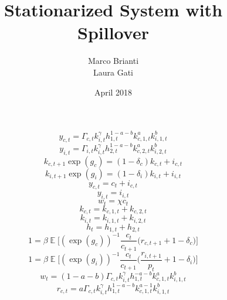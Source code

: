 \documentclass{article}
\title{Stationarized System with Spillover}
\author{Marco Brianti\\Laura Gati}
\date{April 2018}
\DeclareMathOperator{\E}{\mathbb{E}}
\begin{document}
	
	\maketitle

\Large{
	

\begin{equation}
y_{c,t} = \Gamma_{c,t} k_{i,t}^{\gamma} h_{1,t}^{1 - a- b} k_{c,1,t}^a k_{i,1,t}^b
\end{equation}
\begin{equation}
y_{i,t} = \Gamma_{i,t} k_{i,t}^{\gamma} h_{2,t}^{1 - a- b} k_{c,2,t}^a k_{i,2,t}^b
\end{equation}
\begin{equation}
k_{c,t+1} \exp{(g_c)} = (1 - \delta_c)k_{c,t} + i_{c,t}
\end{equation}
\begin{equation}
k_{i,t+1} \exp{(g_i)} = (1 - \delta_i)k_{i,t} + i_{i,t}
\end{equation}
\begin{equation}
y_{c,t} = c_{t} + i_{c,t}
\end{equation}
\begin{equation}
y_{i,t} = i_{i,t}
\end{equation}
\begin{equation}
w_{t} = \chi c_{t}
\end{equation}
\begin{equation}
k_{c,t} = k_{c,1,t} + k_{c,2,t}
\end{equation}
\begin{equation}
k_{i,t} = k_{i,1,t} + k_{i,2,t}
\end{equation}
\begin{equation}
h_{t} = h_{1,t} + h_{2,t}
\end{equation}
\begin{equation}
1 = \beta \E \bigg[ (\exp{(g_c)})^{-1} \frac{c_{t}}{c_{t+1}} \bigg( r_{c,t+1} + 1 - \delta_c   \bigg)     \bigg]
\end{equation}
\begin{equation}
1 = \beta \E \bigg[ (\exp{(g_i)})^{-1} \frac{c_{t}}{c_{t+1}} \bigg( \frac{r_{i,t+1}}{p_t} + 1 - \delta_i  \bigg)     \bigg]
\end{equation}
\begin{equation}
w_t = (1 - a - b)\Gamma_{c,t} k_{i,t}^{\gamma} h_{1,t}^{- a- b} k_{c,1,t}^a k_{i,1,t}^b
\end{equation}
\begin{equation}
r_{c,t} = a \Gamma_{c,t} k_{i,t}^{\gamma} h_{1,t}^{1 - a- b} k_{c,1,t}^{a-1} k_{i,1,t}^b

\end{equation}}
\end{document}
